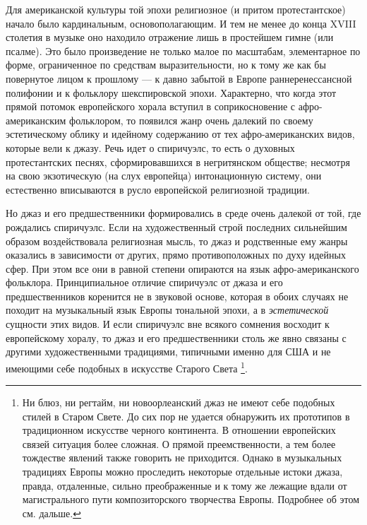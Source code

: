 Для   американской   культуры   той  эпохи   религиозное   (и   притом
протестантское) начало  было кардинальным, основополагающим. И  тем не
менее до конца  XVIII столетия в музыке оно находило  отражение лишь в
простейшем  гимне  (или  псалме).  Это  было  произведение  не  только
малое по  масштабам, элементарное по форме,  ограниченное по средствам
выразительности, но к  тому же как бы повернутое лицом  к прошлому — к
давно  забытой  в Европе  раннеренессансной  полифонии  и к  фольклору
шекспировской  эпохи.  Характерно,  что   когда  этот  прямой  потомок
европейского  хорала  вступил  в соприкосновение  с  афро-американским
фольклором,  то появился  жанр очень  далекий по  своему эстетическому
облику  и   идейному  содержанию   от  тех   афро-американских  видов,
которые  вели к  джазу. Речь  идет о  спиричуэлс, то  есть о  духовных
протестантских  песнях,  сформировавшихся   в  негритянском  обществе;
несмотря  на  свою  экзотическую  (на  слух  европейца)  интонационную
систему, они  естественно вписываются в русло  европейской религиозной
традиции.

Но  джаз и  его предшественники  формировались в  среде очень  далекой
от  той,  где  рождались  спиричуэлс.  Если  на  художественный  строй
последних сильнейшим образом воздействовала религиозная мысль, то джаз
и  родственные ему  жанры  оказались в  зависимости  от других,  прямо
противоположных  по духу  идейных  сфер.  При этом  все  они в  равной
степени опираются на язык афро-американского фольклора. Принципиальное
отличие  спиричуэлс от  джаза и  его предшественников  коренится не  в
звуковой основе,  которая в  обоих случаях  не походит  на музыкальный
язык  Европы тональной  эпохи, а  в \emph{эстетической}  сущности этих
видов. И если спиричуэлс вне  всякого сомнения восходит к европейскому
хоралу, то джаз и его предшественники  столь же явно связаны с другими
художественными  традициями, типичными  именно для  США и  не имеющими
себе подобных в искусстве Старого Света \footnote{Ни блюз, ни регтайм,
ни новоорлеанский джаз  не имеют себе подобных стилей  в Старом Свете.
До  сих  пор  не  удается  обнаружить  их  прототипов  в  традиционном
искусстве черного континента. В  отношении европейских связей ситуация
более сложная. О прямой преемственности, а тем более тождестве явлений
также говорить  не приходится.  Однако в музыкальных  традициях Европы
можно проследить некоторые отдельные истоки джаза, правда, отдаленные,
сильно преображенные и к тому  же лежащие вдали от магистрального пути
композиторского творчества Европы. Подробнее об этом см. дальше.}.


